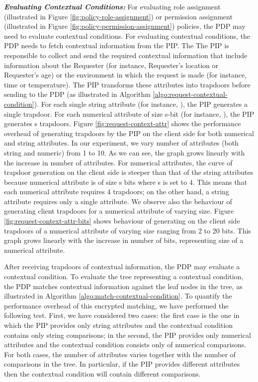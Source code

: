 \documentclass[final,5p,times,twocolumn]{elsarticle}
\begin{document}
\emph{\textbf{Evaluating Contextual Conditions:}}
For evaluating role assignment (illustrated in Figure \ref{fig:policy-role-assignment}) or permission assignment (illustrated in Figure \ref{fig:policy-permission-assignment}) policies, the PDP may need to evaluate contextual conditions. For evaluating contextual conditions, the PDP needs to fetch contextual information from the PIP. The The PIP is responsible to collect and send the required contextual information that include information about the Requester (for instance, Requester's location or Requester's age) or the environment in which the request is made (for instance, time or temperature). The PIP transforms these attributes into trapdoors before sending to the PDP (as illustrated in Algorithm \ref{algo:request-contextual-condition}). For each single string attribute (for instance, ), the PIP generates a single trapdoor. For each numerical attribute of size s-bit (for instance, ), the PIP generates s trapdoors. Figure \ref{fig:request-context-attr} shows the performance overhead of generating trapdoors by the PIP on the client side for both numerical and string attributes. In our experiment, we vary number of attributes (both string and numeric) from 1 to 10. As we can see, the graph grows linearly with the increase in number of attributes. For numerical attributes, the curve of trapdoor generation on the client side is steeper than that of the string attributes because numerical attribute is of size s bits where s is set to 4. This means that each numerical attribute requires 4 trapdoors; on the other hand, a string attribute requires only a single attribute. We observe also the behaviour of generating client trapdoors for a numerical attribute of varying size. Figure \ref{fig:request-context-attr-bits} shows behaviour of generating on the client side trapdoors of a numerical attribute of varying size ranging from 2 to 20 bits. This graph grows linearly with the increase in number of bits, representing size of a numerical attribute.

After receiving trapdoors of contextual information, the PDP may evaluate a contextual condition. To evaluate the tree representing a contextual condition, the PDP matches contextual information against the leaf nodes in the tree, as illustrated in Algorithm \ref{algo:match-contextual-condition}. To quantify the performance overhead of this encrypted matching, we have performed the following test. First, we have considered two cases: the first case is the one in which the PIP provides only string attributes and the contextual condition contains only string comparisons; in the second, the PIP provides only numerical attributes and the contextual condition consists only of numerical comparisons. For both cases, the number of attributes varies together with the number of comparisons in the tree. In particular, if the PIP provides  different attributes then the contextual condition will contain  different comparisons.
\end{document}
